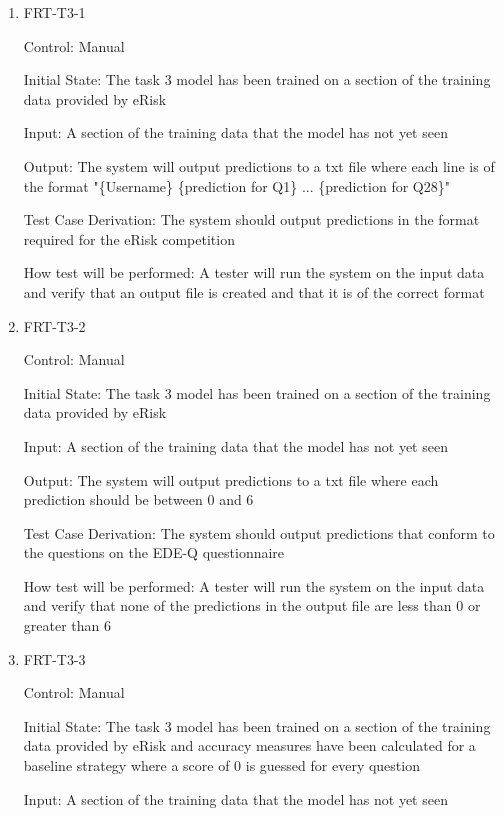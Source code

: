 \documentclass[12pt, titlepage]{article}
\begin{document}
\begin{enumerate}

\item{FRT-T3-1\\}

Control: Manual

Initial State: The task 3 model has been trained on a section of the training data provided by eRisk

Input: A section of the training data that the model has not yet seen

Output: The system will output predictions to a txt file where each line is of the format "\{Username\} \{prediction for Q1\} ... \{prediction for Q28\}"

Test Case Derivation: The system should output predictions in the format required for the eRisk competition

How test will be performed: A tester will run the system on the input data and verify that an output file is created and that it is of the correct format

\item{FRT-T3-2\\}

Control: Manual

Initial State: The task 3 model has been trained on a section of the training data provided by eRisk

Input: A section of the training data that the model has not yet seen

Output: The system will output predictions to a txt file where each prediction should be between 0 and 6

Test Case Derivation: The system should output predictions that conform to the questions on the EDE-Q questionnaire

How test will be performed: A tester will run the system on the input data and verify that none of the predictions in the output file are less than 0 or greater than 6

\item{FRT-T3-3\\}

Control: Manual

Initial State: The task 3 model has been trained on a section of the training data provided by eRisk and accuracy measures have been calculated for a baseline strategy where a score of 0 is guessed for every question

Input: A section of the training data that the model has not yet seen


\end{enumerate}
\end{document}
